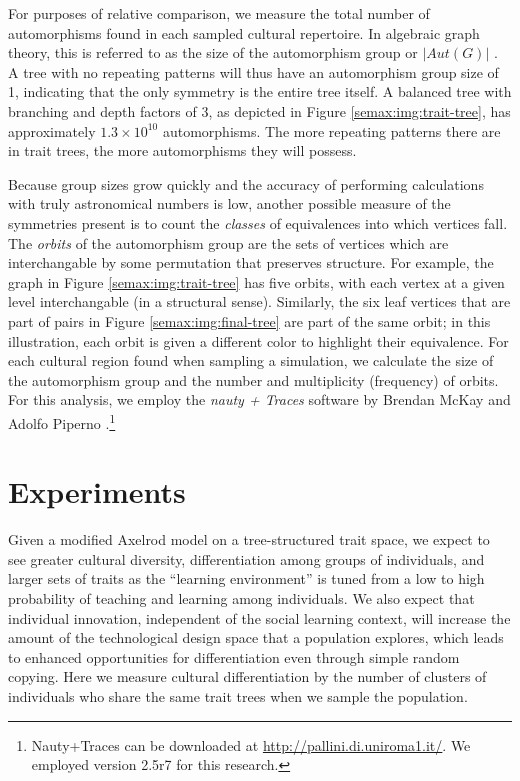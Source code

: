 For purposes of relative comparison, we measure the total number of automorphisms found in each sampled cultural repertoire.  In algebraic graph theory, this is referred to as the size of the automorphism group or $|\textit{Aut}(G)|$
\citep{godsil2001algebraic}. A tree with no repeating patterns will thus
have an automorphism group size of 1, indicating that the only symmetry
is the entire tree itself. A balanced tree with branching and depth
factors of 3, as depicted in Figure \ref{semax:img:trait-tree}, has
approximately $1.3 \times 10^{10}$ automorphisms. The more repeating
patterns there are in trait trees, the more automorphisms they will
possess.

Because group sizes grow quickly and the accuracy of performing
calculations with truly astronomical numbers is low, another possible
measure of the symmetries present is to count the \emph{classes} of
equivalences into which vertices fall. The \emph{orbits} of the
automorphism group are the sets of vertices which are interchangable by
some permutation that preserves structure. For example, the graph in
Figure \ref{semax:img:trait-tree} has five orbits, with each vertex at a given
level interchangable (in a structural sense). Similarly, the six leaf
vertices that are part of pairs in Figure \ref{semax:img:final-tree} are part
of the same orbit; in this illustration, each orbit is given a different
color to highlight their equivalence. For each cultural region found
when sampling a simulation, we calculate the size of the automorphism
group and the number and multiplicity (frequency) of orbits. For this
analysis, we employ the \emph{nauty + Traces} software by Brendan McKay
and Adolfo Piperno \citep{McKay201494}.\footnote{Nauty+Traces can be
  downloaded at \url{http://pallini.di.uniroma1.it/}. We employed
  version 2.5r7 for this research.}

\section{Experiments}\label{semax:sec:experiments}

Given a modified Axelrod model on a tree-structured trait space, we
expect to see greater cultural diversity, differentiation among groups
of individuals, and larger sets of traits as the ``learning
environment'' is tuned from a low to high probability of teaching and
learning among individuals. We also expect that individual innovation,
independent of the social learning context, will increase the amount of
the technological design space that a population explores, which leads
to enhanced opportunities for differentiation even through simple random
copying. Here we measure cultural differentiation by the number of
clusters of individuals who share the same trait trees when we sample
the population.

